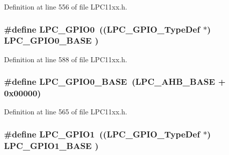 Definition at line 556 of file L\+P\+C11xx.\+h.

\subsubsection[{\texorpdfstring{L\+P\+C\+\_\+\+G\+P\+I\+O0}{LPC_GPIO0}}]{\setlength{\rightskip}{0pt plus 5cm}\#define L\+P\+C\+\_\+\+G\+P\+I\+O0~(({\bf L\+P\+C\+\_\+\+G\+P\+I\+O\+\_\+\+Type\+Def}   $\ast$) {\bf L\+P\+C\+\_\+\+G\+P\+I\+O0\+\_\+\+B\+A\+SE} )}\hypertarget{group___l_p_c11xx___definitions_ga92f3de6ff5cfd5b8c290696fad07b18a}{}\label{group___l_p_c11xx___definitions_ga92f3de6ff5cfd5b8c290696fad07b18a}


Definition at line 588 of file L\+P\+C11xx.\+h.

\subsubsection[{\texorpdfstring{L\+P\+C\+\_\+\+G\+P\+I\+O0\+\_\+\+B\+A\+SE}{LPC_GPIO0_BASE}}]{\setlength{\rightskip}{0pt plus 5cm}\#define L\+P\+C\+\_\+\+G\+P\+I\+O0\+\_\+\+B\+A\+SE~({\bf L\+P\+C\+\_\+\+A\+H\+B\+\_\+\+B\+A\+SE}  + 0x00000)}\hypertarget{group___l_p_c11xx___definitions_ga09e0e964ea1abf3b991772df2aa52405}{}\label{group___l_p_c11xx___definitions_ga09e0e964ea1abf3b991772df2aa52405}


Definition at line 565 of file L\+P\+C11xx.\+h.

\subsubsection[{\texorpdfstring{L\+P\+C\+\_\+\+G\+P\+I\+O1}{LPC_GPIO1}}]{\setlength{\rightskip}{0pt plus 5cm}\#define L\+P\+C\+\_\+\+G\+P\+I\+O1~(({\bf L\+P\+C\+\_\+\+G\+P\+I\+O\+\_\+\+Type\+Def}   $\ast$) {\bf L\+P\+C\+\_\+\+G\+P\+I\+O1\+\_\+\+B\+A\+SE} )}\hypertarget{group___l_p_c11xx___definitions_ga335587dad4e6d0da56c1f3ad1c087d10}{}\label{group___l_p_c11xx___definitions_ga335587dad4e6d0da56c1f3ad1c087d10}


